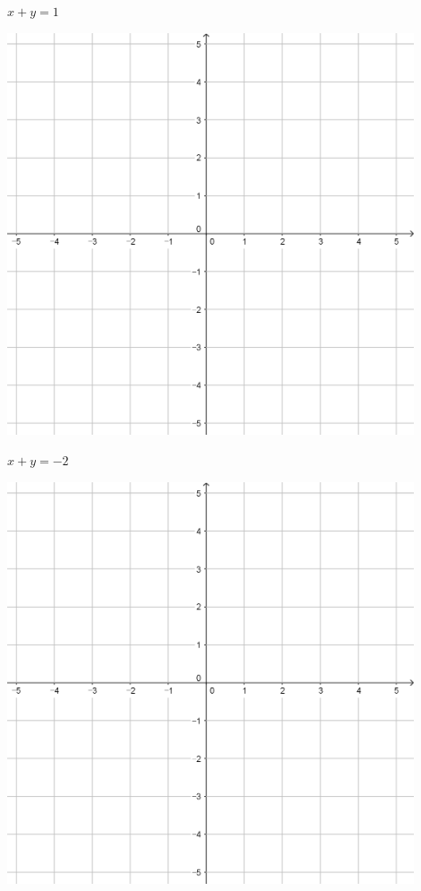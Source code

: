 \documentclass{oblivoir}
\begin{document}
\begin{minipage}{0.45\textwidth}\centering
\(x+y=1\)
\par\bigskip\includegraphics[width=0.9\textwidth]{55}
\end{minipage}
\begin{minipage}{0.45\textwidth}\centering
\(x+y=-2\)
\par\bigskip\includegraphics[width=0.9\textwidth]{55}
\end{minipage}\bigskip\bigskip\par
\end{document}
